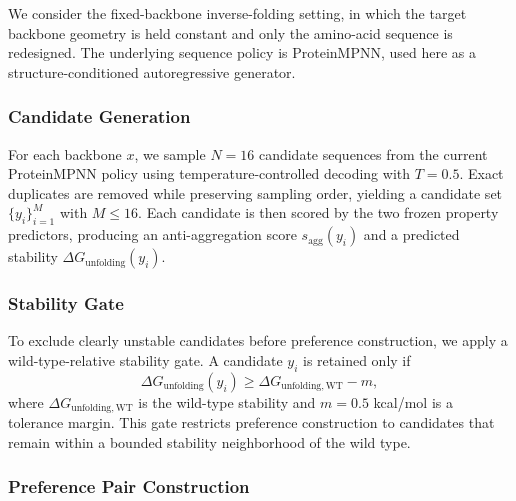 \documentclass[pdflatex,sn-mathphys-num]{sn-jnl}%
\theoremstyle{thmstyleone}%
\theoremstyle{thmstyletwo}%
\theoremstyle{thmstylethree}%
\begin{document}
We consider the fixed-backbone inverse-folding setting, in which the target backbone geometry is held constant and only the amino-acid sequence is redesigned. The underlying sequence policy is ProteinMPNN, used here as a structure-conditioned autoregressive generator.

\subsubsection{Candidate Generation}

For each backbone $x$, we sample $N=16$ candidate sequences from the current ProteinMPNN policy using temperature-controlled decoding with $T=0.5$. Exact duplicates are removed while preserving sampling order, yielding a candidate set $\{y_i\}_{i=1}^{M}$ with $M\le 16$. Each candidate is then scored by the two frozen property predictors, producing an anti-aggregation score $s_{\mathrm{agg}}(y_i)$ and a predicted stability $\Delta G_{\mathrm{unfolding}}(y_i)$.

\subsubsection{Stability Gate}

To exclude clearly unstable candidates before preference construction, we apply a wild-type-relative stability gate. A candidate $y_i$ is retained only if
\begin{equation}
\Delta G_{\mathrm{unfolding}}(y_i) \ge \Delta G_{\mathrm{unfolding,WT}} - m,
\end{equation}
where $\Delta G_{\mathrm{unfolding,WT}}$ is the wild-type stability and $m=0.5$ kcal/mol is a tolerance margin. This gate restricts preference construction to candidates that remain within a bounded stability neighborhood of the wild type.

\subsubsection{Preference Pair Construction}
\end{document}
